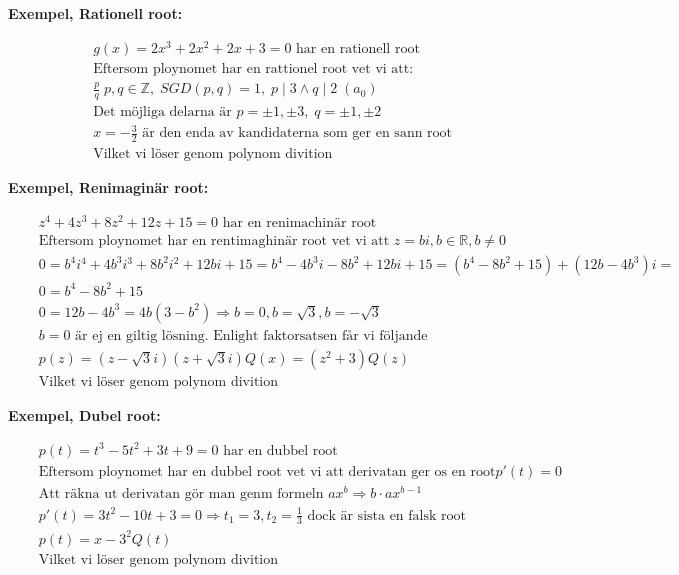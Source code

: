 \newpage
\textbf{Exempel, Rationell root:}\par
\begin{align*}
  &\quad  g(x)= 2x^3 +2x^2 +2x +3 = 0 \text{ har en rationell root} \\
  &\quad  \text{Eftersom ploynomet har en rattionel root vet vi att: } \\
  &\quad  \frac{p}{q} \; p,q \in \mathbb{Z}, \; SGD(p,q) = 1, \; p \mid 3 \land q \mid 2 \; (a_0) \\
  &\quad  \text{Det möjliga delarna är } p=\pm 1,\pm 3, \; q=\pm 1,\pm 2 \\
  &\quad  x=-\frac{3}{2} \text{ är den enda av kandidaterna som ger en sann root} \\
  &\quad  \text{Vilket vi löser genom polynom divition}
\end{align*}


\textbf{Exempel, Renimaginär root:}\par
\begin{align*}
  &\quad  z^4 + 4z^3 + 8z^2 + 12z +15 = 0 \text{ har en renimachinär root} \\
  &\quad  \text{Eftersom ploynomet har en rentimaghinär root vet vi att } z=bi, b \in \mathbb{R}, b \neq 0 \\
  &\quad  0= b^4i^4 +4b^3i^3 +8b^2i^2 +12bi +15 = b^4 -4b^3i -8b^2 +12bi +15 = (b^4-8b^2+15) + (12b-4b^3)i = \\
  &\quad  0= b^4-8b^2+15 \\
  &\quad  0= 12b-4b^3 = 4b(3-b^2) \Rightarrow b=0, b=\sqrt{3}, b=-\sqrt{3} \\
  &\quad  b=0 \text{ är ej en giltig lösning. Enlight faktorsatsen får vi följande} \\
  &\quad  p(z)=(z-\sqrt{3}i)(z+\sqrt{3}i)Q(x) = (z^2+3)Q(z) \\
  &\quad  \text{Vilket vi löser genom polynom divition}
\end{align*}

\textbf{Exempel, Dubel root:}\par
\begin{align*}
  &\quad  p(t)= t^3 -5t^2 +3t +9 = 0 \text{ har en dubbel root} \\
  &\quad  \text{Eftersom ploynomet har en dubbel root vet vi att derivatan ger os en root} p'(t)=0  \\
  &\quad  \text{Att räkna ut derivatan gör man genm formeln } ax^b \Rightarrow b\cdot ax^{b-1} \\
  &\quad  p'(t) = 3t^2 -10t +3 = 0 \Rightarrow t_1=3,t_2=\frac{1}{3} \text{ dock är sista en falsk root} \\
  &\quad  p(t) = {x-3}^2Q(t) \\ 
  &\quad  \text{Vilket vi löser genom polynom divition}
\end{align*}

